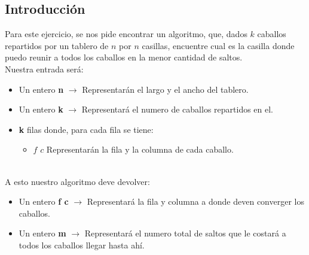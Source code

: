 \subsection{Introducci\'on} 

Para este ejercicio, se nos pide encontrar un algoritmo, que, dados $k$ caballos repartidos por un tablero de $n$ por $n$ casillas, encuentre cual es la casilla donde puedo reunir a todos los caballos en la menor cantidad de saltos.
\\
Nuestra entrada ser\'a:

\begin{itemize}
\item Un entero \textbf{n} $\rightarrow$ Representar\'an el largo y el ancho del tablero.
\item Un entero \textbf{k} $\rightarrow$ Representar\'a el numero de caballos repartidos en el.
\item \textbf{k} filas donde, para cada fila se tiene:
\begin{itemize}
\item $f$ $c$ \rightarrow Representar\'an la fila y la columna de cada caballo.
\end{itemize}
\end{itemize}
\\
A esto nuestro algoritmo deve devolver:
\begin{itemize}
\item Un entero \textbf{f c} $\rightarrow$ Representar\'a la fila y columna a donde deven converger los caballos.
\item Un entero \textbf{m} $\rightarrow$ Representar\'a el numero total de saltos que le costar\'a a todos los caballos llegar hasta ah\'i.
\end{itemize}

